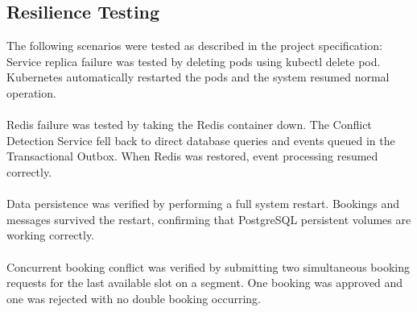 \documentclass{article}
\begin{document}
\subsection{Resilience Testing}
The following scenarios were tested as described in the project specification:\\
Service replica failure was tested by deleting pods using kubectl delete pod. Kubernetes automatically restarted the pods and the system resumed normal operation.\\\\
Redis failure was tested by taking the Redis container down. The Conflict Detection Service fell back to direct database queries and events queued in the Transactional Outbox. When Redis was restored, event processing resumed correctly. \\\\
Data persistence was verified by performing a full system restart. Bookings and messages survived the restart, confirming that PostgreSQL persistent volumes are working correctly.\\\\
Concurrent booking conflict was verified by submitting two simultaneous booking requests for the last available slot on a segment. One booking was approved and one was rejected with no double booking occurring.
\end{document}
